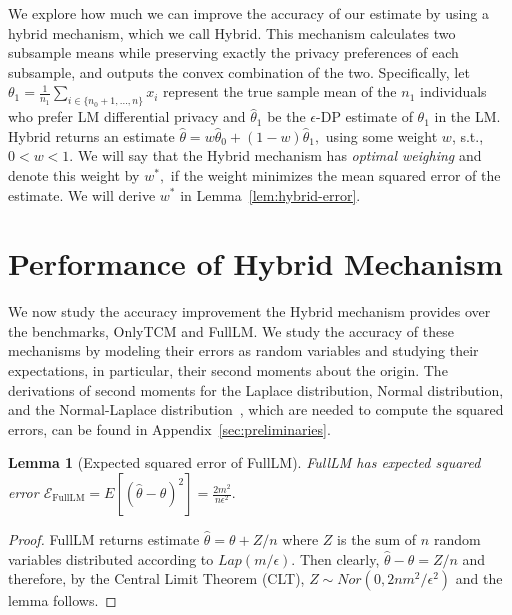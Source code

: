 \documentclass{article}
\theoremstyle{plain}
\newtheorem{lem}[thm]{Lemma}
\begin{document}
We explore how much we can improve the accuracy of our estimate by using a hybrid mechanism, which we call Hybrid. This mechanism calculates two subsample means while preserving exactly the privacy preferences of each subsample, and outputs the convex combination of the two.
Specifically, let $\theta_1 = \frac{1}{n_1}\sum_{i \in \{n_0+1, \dots, n\}} x_i$ represent the true sample mean of the $n_1$ individuals who prefer LM differential privacy and $\hat{\theta}_1$ be the $\epsilon$-DP estimate of $\theta_1$ in the LM. %
Hybrid returns an estimate $\hat{\theta} = w\hat{\theta}_0 + (1-w)\hat{\theta}_1,$ using some weight $w$, s.t., $0 < w < 1.$ We will say that the Hybrid mechanism has \textit{optimal weighing} and denote this weight by $w^*,$ if the weight minimizes the mean squared error of the estimate. We will derive $w^*$ in Lemma~\ref{lem:hybrid-error}.





\section{Performance of Hybrid Mechanism}\label{sec:performance}
We now study the accuracy improvement the Hybrid mechanism provides over the benchmarks, OnlyTCM and FullLM. We study the accuracy of these mechanisms by modeling their errors as random variables and studying their expectations, in particular, their second moments about the origin. The derivations of second moments for the Laplace distribution, Normal distribution, and the Normal-Laplace distribution~\cite{Reed2006}, which are needed to compute the squared errors, can be found in Appendix~\ref{sec:preliminaries}.

\begin{lem}[Expected squared error of FullLM]
\label{MSE_FullLM}
FullLM has expected squared error
$\mathcal{E}_{\text{FullLM}} = E[(\hat{\theta} - \theta)^2] = \frac{2m^2}{n\epsilon^2}.$
\end{lem}
\begin{proof}
FullLM returns estimate $\hat{\theta} = \theta + Z/n$ where $Z$ is the sum of $n$ random variables distributed according to $Lap(m/\epsilon)$. Then clearly, $\hat{\theta} - \theta = Z/n$ and therefore, by the Central Limit Theorem (CLT), $Z \sim Nor(0, 2nm^2/\epsilon^2)$ and the lemma follows. 
\end{proof}
\end{document}
